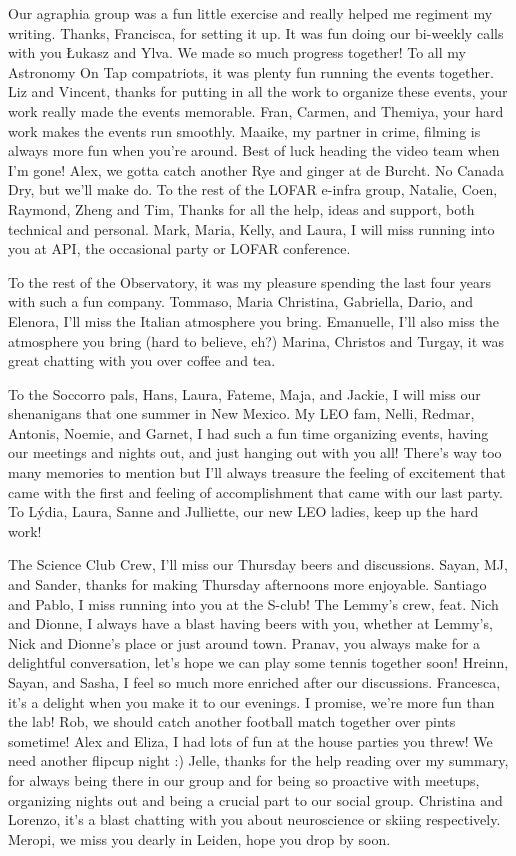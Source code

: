 \begin{thesisacknowledgements}
   Our agraphia group was a fun little exercise and really helped me regiment my writing. Thanks, Francisca, for setting it up. It was fun doing our bi-weekly calls with you \L{}ukasz and Ylva. We made so much progress together! To all my Astronomy On Tap compatriots, it was plenty fun running the events together. Liz and Vincent, thanks for putting in all the work to organize these events, your work really made the events memorable. Fran, Carmen,  and Themiya, your hard work makes the events run smoothly. Maaike, my partner in crime, filming is always more fun when you're around. Best of luck heading the video team when I'm gone! Alex, we gotta catch another Rye and ginger at de Burcht. No Canada Dry, but we'll make do. To the rest of the LOFAR e-infra group, Natalie, Coen, Raymond, Zheng and Tim, Thanks for all the help, ideas and support, both technical and personal. Mark, Maria, Kelly, and Laura, I will miss running into you at API, the occasional party or LOFAR conference. 

    To the rest of the Observatory, it was my pleasure spending the last four years with such a fun company. Tommaso, Maria Christina, Gabriella, Dario, and Elenora, I'll miss the Italian atmosphere you bring. Emanuelle, I'll also miss the atmosphere you bring (hard to believe, eh?) Marina, Christos and Turgay, it was great chatting with you over coffee and tea. 

    To the Soccorro pals, Hans, Laura, Fateme, Maja, and Jackie, I will miss our shenanigans that one summer in New Mexico. My LEO fam, Nelli, Redmar, Antonis, Noemie, and Garnet, I had such a fun time organizing events, having our meetings and nights out, and just hanging out with you all! There's way too many memories to mention but I'll always treasure the feeling of excitement that came with the first and feeling of accomplishment that came with our last party. To  L\'ydia, Laura, Sanne and Julliette, our new LEO ladies, keep up the hard work!

    The Science Club Crew, I'll miss our Thursday beers and discussions. Sayan, MJ, and Sander, thanks for making Thursday afternoons more enjoyable. Santiago and Pablo, I miss running into you at the S-club! The Lemmy's crew, feat. Nich and Dionne, I always have a blast having beers with you, whether at Lemmy's, Nick and Dionne's place or just around town. Pranav, you always make for a delightful conversation, let's hope we can play some tennis together soon! Hreinn, Sayan, and Sasha, I feel so much more enriched after our discussions. Francesca, it's a delight when you make it to our evenings. I promise, we're more fun than the lab! Rob, we should catch another football match together over pints sometime! Alex and Eliza, I had lots of fun at the house parties you threw! We need another flipcup night :) Jelle, thanks for the help reading over my summary, for always being there in our group and for being so proactive with meetups, organizing nights out and being a crucial part to our social group. Christina and Lorenzo, it's a blast chatting with you about neuroscience or skiing respectively. Meropi, we miss you dearly in Leiden, hope you drop by soon. 


\end{thesisacknowledgements}
